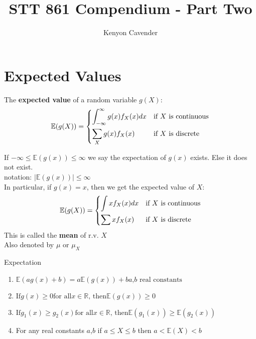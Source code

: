 \documentclass[14pt, oneside, letterpaper]{notes}
\begin{document}
\title{STT 861 Compendium - Part Two}
\author{Kenyon Cavender}
\maketitle

\section*{Expected Values}

\begin{mydef}
	The \textbf{expected value} of a random variable $g(X)$: \\
	\[
	\mathbb{E}(g(X)) = 
		\begin{dcases}
			\int_{-\infty}^{\infty} g(x)f_X(x)dx 
			& \text{if $X$ is continuous} \\			
			\sum_{X}g(x)f_X(x)
			& \text{if $X$ is discrete}
		\end{dcases}
	\]
\end{mydef}

\begin{remark}
If $-\infty \leq \mathbb{E}(g(x)) \leq \infty$ we say the
expectation of $g(x)$ exists.  Else it does not exist. \\
\indent notation: $\left| \mathbb{E}(g(x)) \right| 
\leq \infty$ \\
\indent In particular, if $g(x) = x$, then we get the expected
value of $X$: \\
	\[
	\mathbb{E}(g(X)) = 
		\begin{dcases}
			\int xf_X(x)dx 
			& \text{if $X$ is continuous} \\			
			\sum xf_X(x)
			& \text{if $X$ is discrete}
		\end{dcases}
	\]
\indent This is called the \textbf{mean} of r.v. $X$ \\
\indent Also denoted by $\mu$ or $\mu_X$
\end{remark}

\begin{theorem} Expectation 
\begin{enumerate}
	\item $\mathbb{E}(ag(x) + b) = a\mathbb{E}(g(x)) + b
		\text{$a$,$b$ real constants}$
	\item $\text{If} g(x) \geq 0 \text{for all} x \in 
		\mathbb{R} \text{, then} \mathbb{E}(g(x)) \geq 0$
	\item $\text{If} g_1(x) \geq g_2(x) \text{for all} 
		x \in \mathbb{R} \text{, then} 
		\mathbb{E}(g_1(x)) \geq \mathbb{E}(g_2(x))$
	\item For any real constants $a$,$b$ if $a \leq X 
		\leq b$ then $a < \mathbb{E}(X) < b$
\end{enumerate}
\end{theorem}
\end{document}
